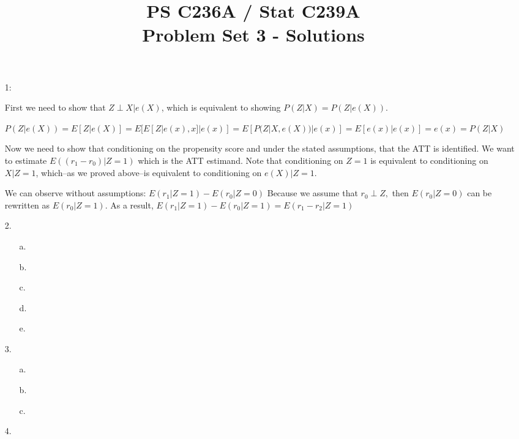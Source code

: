 \documentclass{article}
\begin{document}
\title{PS C236A / Stat C239A \\ Problem Set 3 - Solutions}
\date{}
\maketitle

\begin{itemize}
\item[1:] 

First we need to show that $Z \perp X |e(X)$, which is equivalent to
showing $P(Z|X) = P(Z|e(X))$. 
\vspace{1em}

$P(Z|e(X)) = E[Z|e(X)] = E[E[Z|e(x),
x]|e(x)] = E[P(Z|X, e(X))|e(x)]= E[e(x)|e(x)] = e(x) = P(Z|X)$
\vspace{1em}

Now we need to show that conditioning on the propensity score and under the stated assumptions, that the ATT is identified.
We want to estimate $E((r_1-r_0)| Z =1)$  which is the ATT
estimand. Note that conditioning on $Z = 1$ is equivalent to
conditioning on $X|Z = 1$, which--as we proved above--is equivalent to
conditioning on $e(X)|Z = 1$. 
\vspace{1em}

We can observe without assumptions:
$E(r_1|Z=1)-E(r_0|Z=0)$
Because we assume that $r_0 \perp Z,$ then $E(r_0|Z = 0)$ can be rewritten as $E(r_0|Z = 1)$. As a result,
$E(r_1|Z =1)-E(r_0|Z =1)=E(r_1 -r_2|Z =1)$


\item[2.]
\begin{itemize}
\item[a.]
\item[b.]
\item[c.]
\item[d.]
\item[e.]
\end{itemize}


\item[3.]
\begin{itemize}
\item[a.]
\item[b.]
\item[c.]
\end{itemize}


\item[4.]


\end{itemize}
\end{document}
